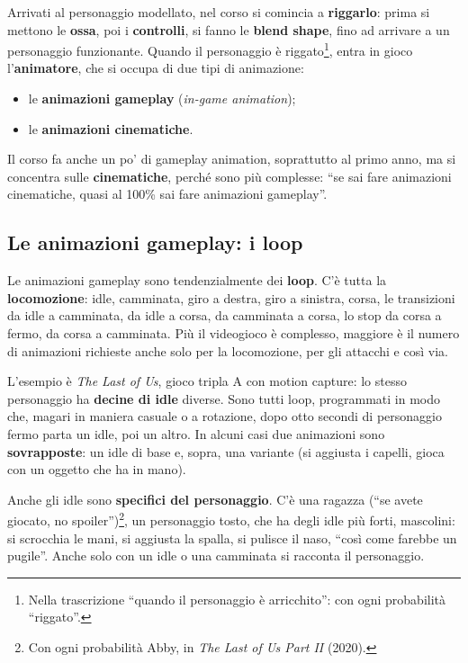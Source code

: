 Arrivati al personaggio modellato, nel corso si comincia a \textbf{riggarlo}:
prima si mettono le \textbf{ossa}, poi i \textbf{controlli}, si fanno le
\textbf{blend shape}, fino ad arrivare a un personaggio funzionante. Quando
il personaggio è riggato\footnote{Nella trascrizione ``quando il personaggio
è arricchito'': con ogni probabilità ``riggato''.}, entra in gioco
l'\textbf{animatore}, che si occupa di due tipi di animazione:
\begin{itemize}
  \item le \textbf{animazioni gameplay} (\emph{in-game animation});
  \item le \textbf{animazioni cinematiche}.
\end{itemize}
Il corso fa anche un po' di gameplay animation, soprattutto al primo anno, ma
si concentra sulle \textbf{cinematiche}, perché sono più complesse: ``se sai
fare animazioni cinematiche, quasi al 100\% sai fare animazioni gameplay''.

\subsection{Le animazioni gameplay: i loop}

Le animazioni gameplay sono tendenzialmente dei \textbf{loop}. C'è tutta la
\textbf{locomozione}: idle, camminata, giro a destra, giro a sinistra, corsa,
le transizioni da idle a camminata, da idle a corsa, da camminata a corsa, lo
stop da corsa a fermo, da corsa a camminata. Più il videogioco è complesso,
maggiore è il numero di animazioni richieste anche solo per la locomozione,
per gli attacchi e così via.

L'esempio è \emph{The Last of Us}, gioco tripla A con motion capture: lo
stesso personaggio ha \textbf{decine di idle} diverse. Sono tutti loop,
programmati in modo che, magari in maniera casuale o a rotazione, dopo otto
secondi di personaggio fermo parta un idle, poi un altro. In alcuni casi due
animazioni sono \textbf{sovrapposte}: un idle di base e, sopra, una variante
(si aggiusta i capelli, gioca con un oggetto che ha in mano).

Anche gli idle sono \textbf{specifici del personaggio}. C'è una ragazza
(``se avete giocato, no spoiler'')\footnote{Con ogni probabilità Abby, in
\emph{The Last of Us Part II} (2020).}, un personaggio tosto, che ha degli
idle più forti, mascolini: si scrocchia le mani, si aggiusta la spalla, si
pulisce il naso, ``così come farebbe un pugile''. Anche solo con un idle o una
camminata si racconta il personaggio.

